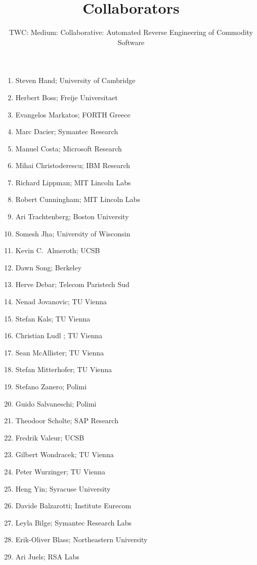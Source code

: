 \documentclass[letterpaper,11pt]{scrartcl}
\newcommand{\thetitle}{TWC: Medium: Collaborative: Automated Reverse Engineering of Commodity Software\xspace}
\begin{document}
\title{Collaborators}
\subtitle{\thetitle}
\author{}
\date{}
\maketitle

\begin{enumerate}
    \item Steven Hand; University of Cambridge
    \item Herbert Boss; Freije Universitaet
    \item Evangelos Markatos; FORTH Greece
    \item Marc Dacier; Symantec Research
    \item Manuel Costa; Microsoft Research
    \item Mihai Christoderescu; IBM Research
    \item Richard Lippman; MIT Lincoln Labs
    \item Robert Cunningham; MIT Lincoln Labs
    \item Ari Trachtenberg; Boston University
    \item Somesh Jha; University of Wisconsin
    \item Kevin C.~Almeroth; UCSB
    \item Dawn Song; Berkeley
    \item Herve Debar; Telecom Paristech Sud
    \item Nenad Jovanovic; TU Vienna
    \item Stefan Kals; TU Vienna
    \item Christian Ludl ; TU Vienna
    \item Sean McAllister; TU Vienna
    \item Stefan Mitterhofer; TU Vienna
    \item Stefano Zanero; Polimi
    \item Guido Salvaneschi; Polimi
    \item Theodoor Scholte; SAP Research
    \item Fredrik Valeur; UCSB
    \item Gilbert Wondracek; TU Vienna
    \item Peter Wurzinger; TU Vienna
    \item Heng Yin; Syracuse University
    \item Davide Balzarotti; Institute Eurecom
    \item Leyla Bilge; Symantec Research Labs
    \item Erik-Oliver Blass; Northeastern University
    \item Ari Juels; RSA Labs

\end{enumerate}
\end{document}
